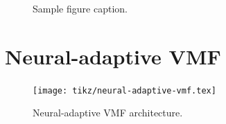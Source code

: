 \begin{figure}[ht]
\begin{center}
\fbox{\rule[-.5cm]{0cm}{4cm} \rule[-.5cm]{4cm}{0cm}}
\end{center}
\caption{Sample figure caption.}
\end{figure}

\section{Neural-adaptive VMF}

\begin{figure}
  \centering
  \texttt{[image: tikz/neural-adaptive-vmf.tex]}
  \caption{Neural-adaptive VMF architecture.}
  \label{fig:neural-adaptive-vmf}
\end{figure}
